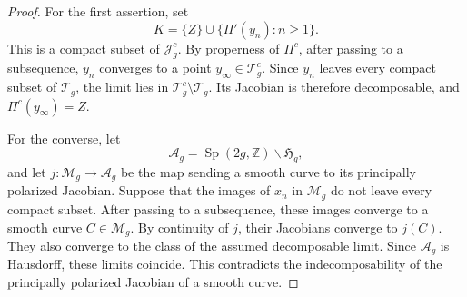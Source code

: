 \documentclass[dvipdfmx]{amsart}
\theoremstyle{remark}
\newcommand{\torelli}{\mathscr{T}}
\begin{document}
\begin{proof}
For the first assertion, set
\[
K=\{Z\}\cup\{\Pi'(y_n):n\ge1\}.
\]
This is a compact subset of $\mathcal{J}_g^c$.
By properness of $\Pi^c$, after passing to a
subsequence, $y_n$ converges to a point
$y_\infty\in\torelli_g^c$.
Since $y_n$ leaves every compact subset of
$\torelli_g$, the limit lies in
$\torelli_g^c\setminus\torelli_g$.
Its Jacobian is therefore decomposable, and
$\Pi^c(y_\infty)=Z$.

For the converse, let
\[
\mathcal A_g
=
\operatorname{Sp}(2g,\mathbb Z)\backslash\mathfrak H_g,
\]
and let $j\colon\mathcal M_g\to\mathcal A_g$
be the map sending a smooth curve to its
principally polarized Jacobian.
Suppose that the images of $x_n$ in $\mathcal M_g$
do not leave every compact subset.
After passing to a subsequence, these images
converge to a smooth curve $C\in\mathcal M_g$.
By continuity of $j$, their Jacobians converge
to $j(C)$.
They also converge to the class of the assumed
decomposable limit.
Since $\mathcal A_g$ is Hausdorff, these limits
coincide.
This contradicts the indecomposability of the
principally polarized Jacobian of a smooth curve.
\end{proof}
\end{document}
